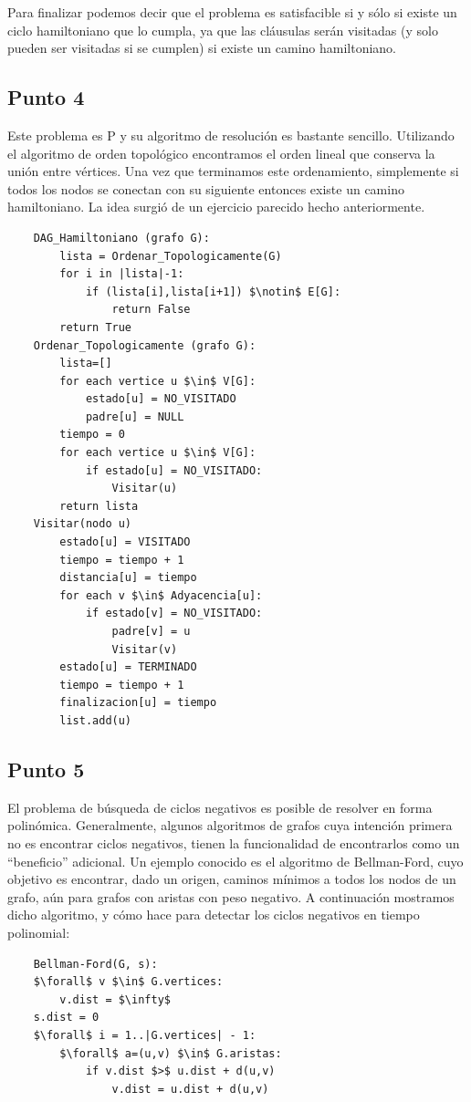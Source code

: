 \documentclass[a4paper,10pt]{article}
\begin{document}
	Para finalizar podemos decir que el problema es satisfacible si y sólo si existe un ciclo hamiltoniano que lo cumpla, ya que las cláusulas serán visitadas (y solo pueden ser visitadas si se cumplen) si existe un camino hamiltoniano.

\subsection{Punto 4}
	Este problema es P y su algoritmo de resolución es bastante sencillo. Utilizando el algoritmo de orden topológico encontramos el orden lineal que conserva la unión entre vértices. Una vez que terminamos este ordenamiento, simplemente si todos los nodos se conectan con su siguiente entonces existe un camino hamiltoniano. La idea surgió de un ejercicio parecido hecho anteriormente.
	\begin{lstlisting}
	DAG_Hamiltoniano (grafo G):
	    lista = Ordenar_Topologicamente(G)
	    for i in |lista|-1:
	        if (lista[i],lista[i+1]) $\notin$ E[G]:
	            return False
	    return True
	Ordenar_Topologicamente (grafo G):
	    lista=[]
	    for each vertice u $\in$ V[G]:
	        estado[u] = NO_VISITADO
	        padre[u] = NULL
	    tiempo = 0
	    for each vertice u $\in$ V[G]:
	        if estado[u] = NO_VISITADO:
	            Visitar(u)
	    return lista
	Visitar(nodo u)
	    estado[u] = VISITADO
	    tiempo = tiempo + 1
	    distancia[u] = tiempo
	    for each v $\in$ Adyacencia[u]:
	        if estado[v] = NO_VISITADO:
	            padre[v] = u
	            Visitar(v)
	    estado[u] = TERMINADO
	    tiempo = tiempo + 1
	    finalizacion[u] = tiempo
	    list.add(u)
	\end{lstlisting}

\subsection{Punto 5} \label{punto5}
	El problema de búsqueda de ciclos negativos es posible de resolver en forma polinómica. Generalmente, algunos algoritmos de grafos cuya intención primera no es encontrar ciclos negativos, tienen la funcionalidad de encontrarlos como un ``beneficio'' adicional. Un ejemplo conocido es el algoritmo de Bellman-Ford, cuyo objetivo es encontrar, dado un origen, caminos mínimos a todos los nodos de un grafo, aún para grafos con aristas con peso negativo. A continuación mostramos dicho algoritmo, y cómo hace para detectar los ciclos negativos en tiempo polinomial:
	\begin{lstlisting}
	Bellman-Ford(G, s):
	$\forall$ v $\in$ G.vertices:
	    v.dist = $\infty$
	s.dist = 0
	$\forall$ i = 1..|G.vertices| - 1:
	    $\forall$ a=(u,v) $\in$ G.aristas:
	        if v.dist $>$ u.dist + d(u,v)
	            v.dist = u.dist + d(u,v)
	\end{lstlisting}
\end{document}
